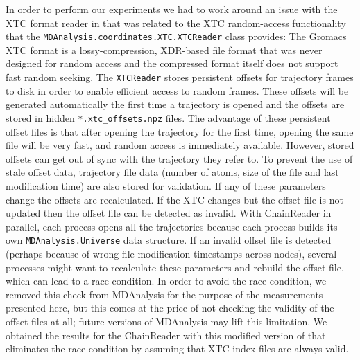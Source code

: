 In order to perform our experiments we had to work around an issue with the XTC format reader in  that was related to the XTC random-access functionality that the \texttt{MDAnalysis.coordinates.XTC.XTCReader} class provides:
The Gromacs XTC format \cite{Lindahl01, Spangberg:2011zr} is a lossy-compression, XDR-based file format that was never designed for random access and the compressed format itself does not support fast random seeking.
The \texttt{XTCReader} stores persistent offsets for trajectory frames to disk \cite{Gowers:2016aa} in order to enable efficient access to random frames.
These offsets will be generated automatically the first time a trajectory is opened and the offsets are stored in hidden \texttt{*.xtc\_offsets.npz} files. 
The advantage of these persistent offset files is that after opening the trajectory for the first time, opening the same file will be very fast, and random access is immediately available. 
However, stored offsets can get out of sync with the trajectory they refer to. 
To prevent the use of stale offset data, trajectory file data (number of atoms, size of the file and last modification time) are also stored for validation.
If any of these parameters change the offsets are recalculated. 
If the XTC changes but the offset file is not updated then the offset file can be detected as invalid.
With ChainReader in parallel, each process opens all the trajectories because each process builds its own \texttt{MDAnalysis.Universe} data structure.
If an invalid offset file is detected (perhaps because of wrong file modification timestamps across nodes), several processes might want to recalculate these parameters and rebuild the offset file, which can lead to a race condition.
In order to avoid the race condition, we removed this check from MDAnalysis for the purpose of the measurements presented here, but this comes at the price of not checking the validity of the offset files at all; future versions of MDAnalysis may lift this limitation.  
We obtained the results for the ChainReader with this modified version of  that eliminates the race condition by assuming that XTC index files are always valid.

